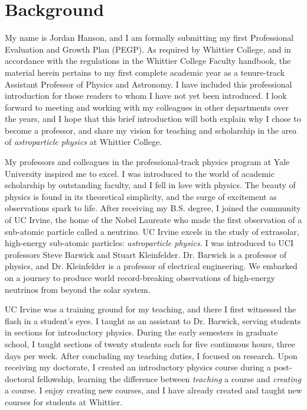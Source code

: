 \documentclass[../../main.tex]{subfiles}
\begin{document}
\section{Background}

My name is Jordan Hanson, and I am formally submitting my first Professional Evaluation and Growth Plan (PEGP).  As required by Whittier College, and in accordance with the regulations in the Whittier College Faculty handbook, the material herein pertains to my first complete academic year as a tenure-track Assistant Professor of Physics and Astronomy.  I have included this professional introduction for those readers to whom I have not yet been introduced.  I look forward to meeting and working with my colleagues in other departments over the years, and I hope that this brief introduction will both explain why I chose to become a professor, and share my vision for teaching and scholarship in the area of \textit{astroparticle physics} at Whittier College. \\ \hspace{0.1cm}

My professors and colleagues in the professional-track physics program at Yale University inspired me to excel.  I was introduced to the world of academic scholarship by outstanding faculty, and I fell in love with physics.  The beauty of physics is found in its theoretical simplicity, and the surge of excitement as observations spark to life.  After receiving my B.S. degree, I joined the community of UC Irvine, the home of the Nobel Laureate who made the first observation of a sub-atomic particle called a neutrino.  UC Irvine excels in the study of extrasolar, high-energy sub-atomic particles: \textit{astroparticle physics.}  I was introduced to UCI professors Steve Barwick and Stuart Kleinfelder.  Dr. Barwick is a professor of physics, and Dr. Kleinfelder is a professor of electrical engineering.  We embarked on a journey to produce world record-breaking observations of high-energy neutrinos from beyond the solar system. \\ \hspace{0.1cm}

UC Irvine was a training ground for my teaching, and there I first witnessed the flash in a student's eyes.  I taught as an assistant to Dr. Barwick, serving students in sections for introductory physics.  During the early semesters in graduate school, I taught sections of twenty students each for five continuous hours, three days per week.  After concluding my teaching duties, I focused on research.  Upon receiving my doctorate, I created an introductory physics course during a post-doctoral fellowship, learning the difference between \textit{teaching} a course and \textit{creating} a course.  I enjoy creating new courses, and I have already created and taught new courses for students at Whittier.
\end{document}
